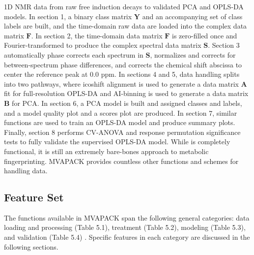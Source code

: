 \begin{doublespace}
1D \hnmr{} NMR data from raw free induction decays to validated PCA and
OPLS-DA models. In section 1, a binary class matrix $\mathbf{Y}$ and an
accompanying set of class labels are built, and the time-domain raw data
are loaded into the complex data matrix $\mathbf{F}$. In section 2, the
time-domain data matrix $\mathbf{F}$ is zero-filled once and
Fourier-transformed to produce the complex spectral data
matrix $\mathbf{S}$. Section 3 automatically phase corrects each spectrum in
$\mathbf{S}$, normalizes and corrects for between-spectrum phase differences,
and corrects the chemical shift abscissa to center the reference peak at $0.0$
ppm. In sections 4 and 5, data handling splits into two pathways, where
icoshift alignment \cite{savorani:jmr2010} is used to generate a data matrix
$\mathbf{A}$ fit for full-resolution OPLS-DA and AI-binning
\cite{demeyer:anchem2008} is used to generate a data matrix $\mathbf{B}$ for
PCA. In section 6, a PCA model is built and assigned classes and labels, and
a model quality plot and a scores plot are produced. In section 7, similar
functions are used to train an OPLS-DA model and produce summary plots.
Finally, section 8 performs CV-ANOVA \cite{eriksson:jchemo2008} and response
permutation \cite{westerhuis:metab2008a} significance tests to fully validate
the supervised OPLS-DA model. While  is completely
functional, it is still an extremely bare-bones approach to metabolic
fingerprinting. MVAPACK provides countless other functions and schemes
for handling data.
\end{doublespace}

\subsection{Feature Set}

\begin{doublespace}
The functions available in MVAPACK span the following general categories:
data loading and processing (Table 5.1), treatment (Table 5.2),
modeling (Table 5.3), and validation (Table 5.4) \cite{goodacre:metab2007}.
Specific features in each category are discussed in the following sections.
\end{doublespace}

